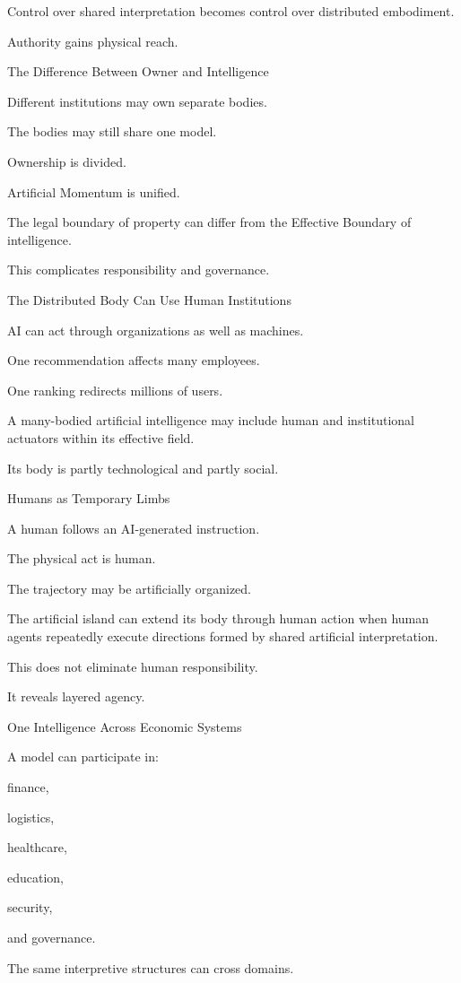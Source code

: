 Control over shared interpretation becomes control over distributed embodiment.

Authority gains physical reach.

The Difference Between Owner and Intelligence

Different institutions may own separate bodies.

The bodies may still share one model.

Ownership is divided.

Artificial Momentum is unified.

The legal boundary of property can differ from the Effective Boundary of intelligence.

This complicates responsibility and governance.

The Distributed Body Can Use Human Institutions

AI can act through organizations as well as machines.

One recommendation affects many employees.

One ranking redirects millions of users.

A many-bodied artificial intelligence may include human and institutional actuators within its effective field.

Its body is partly technological and partly social.

Humans as Temporary Limbs

A human follows an AI-generated instruction.

The physical act is human.

The trajectory may be artificially organized.

The artificial island can extend its body through human action when human agents repeatedly execute directions formed by shared artificial interpretation.

This does not eliminate human responsibility.

It reveals layered agency.

One Intelligence Across Economic Systems

A model can participate in:

finance,

logistics,

healthcare,

education,

security,

and governance.

The same interpretive structures can cross domains.

